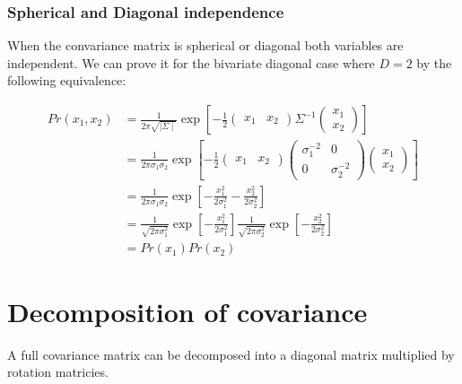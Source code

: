 \documentclass{article}
\begin{document}
\subsubsection{Spherical and Diagonal independence}

When the convariance matrix is spherical or diagonal both variables are independent. We can prove it for the bivariate diagonal case where $D=2$ by the following equivalence:

\begin{align*}
	Pr\left( x_1,x_2 \right) &= \frac{1}{2\pi \sqrt{\mid \Sigma  \mid} } \exp\left[ -\frac{1}{2} \begin{pmatrix} x_1 & x_2 \end{pmatrix} \Sigma^{-1} \begin{pmatrix} x_1 \\ x_2  \end{pmatrix}     \right]  \\
							 &= \frac{1}{2\pi \sigma_1 \sigma_2} \exp\left[ -\frac{1}{2} \begin{pmatrix} x_1 & x_2 \end{pmatrix} \begin{pmatrix} \sigma_1^{-2} & 0 \\ 0 & \sigma_2^{-2} \end{pmatrix} \begin{pmatrix} x_1 \\ x_2 \end{pmatrix}     \right] \\
						 &= \frac{1}{2\pi \sigma_1 \sigma_2 } \exp\left[ -\frac{x_1^2}{2\sigma_1^2} - \frac{x_2^2}{2\sigma^2_2} \right] \\
						 &= \frac{1}{\sqrt{2\pi \sigma^2_1}} \exp\left[ -\frac{x_1^2}{2\sigma_1^2}  \right] \frac{1}{\sqrt{2\pi \sigma^2_2}} \exp\left[ -\frac{x_2^2}{2\sigma_2^2}  \right] \\
						 &= Pr\left( x_1 \right) Pr\left( x_2 \right) 
\end{align*}

\section{Decomposition of covariance}

A full covariance matrix can be decomposed into a diagonal matrix multiplied by rotation matricies. 
\end{document}
